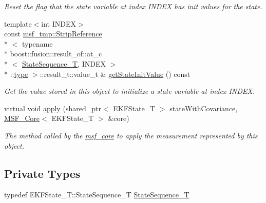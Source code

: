 \begin{DoxyCompactItemize}
\begin{DoxyCompactList}\small\item\em Reset the flag that the state variable at index I\-N\-D\-E\-X has init values for the state. \end{DoxyCompactList}\item 
{\footnotesize template$<$int I\-N\-D\-E\-X$>$ }\\const \hyperlink{structmsf__tmp_1_1StripReference}{msf\-\_\-tmp\-::\-Strip\-Reference}\\*
$<$ typename \\*
boost\-::fusion\-::result\-\_\-of\-::at\-\_\-c\\*
$<$ \hyperlink{classmsf__core_1_1MSF__InitMeasurement_ad7fbcb406d4386f3a3088ecf8eb17585}{State\-Sequence\-\_\-\-T}, I\-N\-D\-E\-X $>$\\*
\-::\hyperlink{classmsf__core_1_1MSF__InitMeasurement_a6ade2a1ba88e5f26de2125258e4c5238}{type} $>$\-::result\-\_\-t\-::value\-\_\-t \& \hyperlink{classmsf__core_1_1MSF__InitMeasurement_acd59df20e43b7151b1549b1a43a93511}{get\-State\-Init\-Value} () const 
\begin{DoxyCompactList}\small\item\em Get the value stored in this object to initialize a state variable at index I\-N\-D\-E\-X. \end{DoxyCompactList}\item 
virtual void \hyperlink{classmsf__core_1_1MSF__InitMeasurement_a7b92f1e55007491bec20273f6cc25ba6}{apply} (shared\-\_\-ptr$<$ E\-K\-F\-State\-\_\-\-T $>$ state\-With\-Covariance, \hyperlink{classmsf__core_1_1MSF__Core}{M\-S\-F\-\_\-\-Core}$<$ E\-K\-F\-State\-\_\-\-T $>$ \&core)
\begin{DoxyCompactList}\small\item\em The method called by the \hyperlink{namespacemsf__core}{msf\-\_\-core} to apply the measurement represented by this object. \end{DoxyCompactList}\end{DoxyCompactItemize}
\subsection*{Private Types}
\begin{DoxyCompactItemize}
\item 
typedef E\-K\-F\-State\-\_\-\-T\-::\-State\-Sequence\-\_\-\-T \hyperlink{classmsf__core_1_1MSF__InitMeasurement_ad7fbcb406d4386f3a3088ecf8eb17585}{State\-Sequence\-\_\-\-T}
\end{DoxyCompactItemize}
